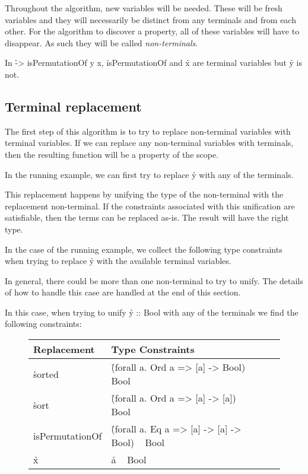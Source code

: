 \documentclass[a4paper, 11pt, onepage]{article}
\begin{document}
Throughout the algorithm, new variables will be needed.
These will be fresh variables and they will necessarily be distinct from any terminals and from each other.
For the algorithm to discover a property, all of these variables will have to disappear.
As such they will be called \emph{non-terminals}.

\begin{ex}
  In \h{\x -> isPermutationOf y x}, \h{isPermutationOf} and \h{x} are terminal variables but \h{y} is not.
\end{ex}


\subsection{Terminal replacement}

The first step of this algorithm is to try to replace non-terminal variables with terminal variables.
If we can replace any non-terminal variables with terminals, then the resulting function will be a property of the scope.

In the running example, we can first try to replace \h{y} with any of the terminals.

This replacement happens by unifying the type of the non-terminal with the replacement non-terminal.
If the constraints associated with this unification are satisfiable, then the terms can be replaced as-is.
The result will have the right type.

In the case of the running example, we collect the following type constraints when trying to replace \h{y} with the available terminal variables.

In general, there could be more than one non-terminal to try to unify.
The details of how to handle this case are handled at the end of this section.

In this case, when trying to unify \h{y :: Bool} with any of the terminals we find the following constraints:

\begin{figure}[H]
  \centering
  \begin{tabular}{|l|l|l|}
    \hline
    Replacement & Type Constraints \\
    \hline
    \hline
    \h{sorted} & \h{(forall a. Ord a => [a] -> Bool) ~ Bool} \\
    \hline
    \h{sort} & \h{(forall a. Ord a => [a] -> [a]) ~ Bool} \\
    \hline
    \h{isPermutationOf} & \h{(forall a. Eq a => [a] -> [a] -> Bool) ~ Bool} \\
    \hline
    \h{x} & \h{a ~ Bool} \\
    \hline
  \end{tabular}
\end{figure}
\end{document}
